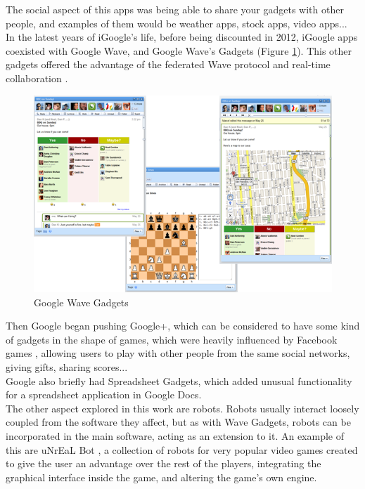 The social aspect of this apps was being able to share your gadgets with other people, and examples of them would be weather apps, stock apps, video apps...\\[.2cm]
In the latest years of iGoogle's life, before being discounted in 2012, iGoogle apps coexisted with Google Wave, and Google Wave's Gadgets (Figure \ref{fig:wave_gadgets}). This other gadgets offered the advantage of the federated Wave protocol and real-time collaboration \cite{ref:apache_wave_about}.\\[.2cm]
\begin{figure}[h]
  \center
    \includegraphics[keepaspectratio, scale=0.5]{Media/Captures/Soa/WaveGadgets.png}
  \caption{Google Wave Gadgets}
  \label{fig:wave_gadgets}
\end{figure}
Then Google began pushing Google+, which can be considered to have some kind of gadgets in the shape of games, which were heavily influenced by Facebook games \cite{ref:facebook_games}, allowing users to play with other people from the same social networks, giving gifts, sharing scores...\\[.2cm]
Google also briefly had Spreadsheet Gadgets, which added unusual functionality for a spreadsheet application in Google Docs.\\[.2cm]
The other aspect explored in this work are robots. Robots usually interact loosely coupled from the software they affect, but as with Wave Gadgets, robots can be incorporated in the main software, acting as an extension to it. An example of this are uNrEaL Bot \cite{ref:unreal_bot}, a collection of robots for very popular video games created to give the user an advantage over the rest of the players, integrating the graphical interface inside the game, and altering the game's own engine.


